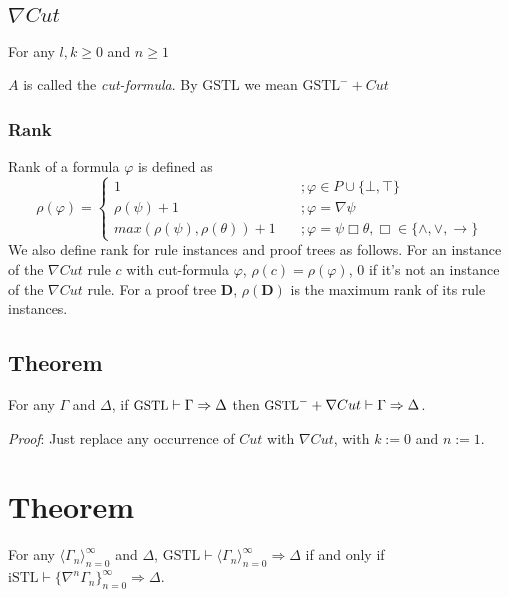 \subsection{$\nabla Cut$} For any $l,k \ge 0$ and $n \ge 1$
\begin{prooftree}
\end{prooftree}
$A$ is called the \textit{cut-formula}.
By $\text{GSTL}$ we mean $\text{GSTL}^- + Cut$
\subsubsection{Rank} Rank of a formula $\varphi$ is defined as
\[ \rho(\varphi) = \begin{cases}
1 & \quad ; \varphi \in P \cup \{ \bot, \top \} \\
\rho(\psi) + 1 & \quad ; \varphi = \nabla \psi \\
max(\rho(\psi), \rho(\theta)) + 1 & \quad ; \varphi = \psi \Box \theta, \Box \in \{ \land , \lor, \rightarrow \}
\end{cases} \]
We also define rank for rule instances and proof trees as follows. For an instance of the $\nabla Cut$ rule $c$ with cut-formula $\varphi$, $\rho(c) = \rho(\varphi)$, $0$ if it's not an instance of the $\nabla Cut$ rule.
For a proof tree $\mathbf{D}$, $\rho(\mathbf{D})$ is the maximum rank of its rule instances.

\subsection{Theorem} For any $\Gamma$ and $\Delta$, if $\small\text{GSTL} \vdash \Gamma \Rightarrow \Delta$ then $\small\text{GSTL}^- + \nabla Cut \vdash \Gamma \Rightarrow \Delta$.

\textit{Proof}: Just replace any occurrence of $Cut$ with $\nabla Cut$, with $k := 0$ and $n := 1$.

\section{Theorem} For any $\langle \Gamma_n \rangle_{n=0}^\infty$ and $\Delta$, $\text{GSTL} \vdash \langle \Gamma_n \rangle_{n=0}^\infty \Rightarrow \Delta$ if and only if $\text{iSTL} \vdash \{ \nabla^n \Gamma_n \}_{n=0}^\infty \Rightarrow \Delta$.

